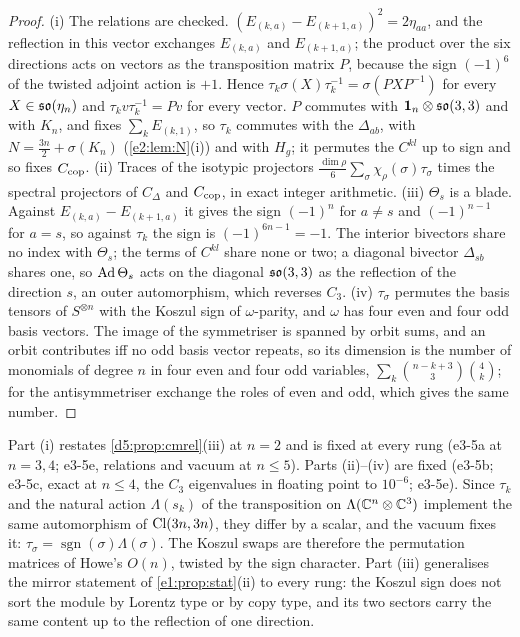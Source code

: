 \begin{proof}
(i) The relations are checked. $(E_{(k,a)}-E_{(k+1,a)})^2=2\eta_{aa}$, and the reflection in this vector exchanges $E_{(k,a)}$ and $E_{(k+1,a)}$; the product
over the six directions acts on vectors as the transposition matrix $P$, because the sign $(-1)^6$ of the twisted adjoint action is $+1$. Hence
$\tau_k\sigma(X)\tau_k^{-1}=\sigma(PXP^{-1})$ for every $X\in\mathfrak{so}(\eta_n)$ and $\tau_kv\tau_k^{-1}=Pv$ for every vector. $P$ commutes with $\mathbf 1_n\otimes\mathfrak{so}(3,3)$ and with
$K_n$, and fixes $\sum_kE_{(k,1)}$, so $\tau_k$ commutes with the $\Delta_{ab}$, with $N=\tfrac{3n}2+\sigma(K_n)$ (\cref{e2:lem:N}(i)) and with $H_g$; it permutes
the $C^{kl}$ up to sign and so fixes $C_{\rm cop}$. (ii) Traces of the isotypic projectors
$\frac{\dim\rho}{6}\sum_\sigma\chi_\rho(\sigma)\tau_\sigma$ times the spectral projectors of $C_\Delta$ and $C_{\rm cop}$, in exact integer arithmetic. (iii) $\Theta_s$ is a
blade. Against $E_{(k,a)}-E_{(k+1,a)}$ it gives the sign $(-1)^n$ for $a\ne s$ and $(-1)^{n-1}$ for $a=s$, so against $\tau_k$ the sign is $(-1)^{6n-1}=-1$.
The interior bivectors share no index with $\Theta_s$; the terms of $C^{kl}$ share none or two; a diagonal bivector $\Delta_{sb}$ shares one, so
$\operatorname{Ad}\Theta_s$ acts on the diagonal $\mathfrak{so}(3,3)$ as the reflection of the direction $s$, an outer automorphism, which reverses $C_3$. (iv) $\tau_\sigma$
permutes the basis tensors of $S^{\otimes n}$ with the Koszul sign of $\omega$-parity, and $\omega$ has four even and four odd basis vectors. The image of
the symmetriser is spanned by orbit sums, and an orbit contributes iff no odd basis vector repeats, so its dimension is the number of
monomials of degree $n$ in four even and four odd variables, $\sum_k\binom{n-k+3}3\binom4k$; for the antisymmetriser exchange the roles of even
and odd, which gives the same number.
\end{proof}

Part (i) restates \cref{d5:prop:cmrel}(iii) at $n=2$ and is fixed at every rung (e3-5a at $n=3,4$; e3-5e, relations and vacuum at
$n\le5$). Parts (ii)--(iv) are fixed (e3-5b; e3-5c, exact at $n\le4$, the $C_3$ eigenvalues in floating point to $10^{-6}$; e3-5e). Since $\tau_k$
and the natural action $\Lambda(s_k)$ of the transposition on $\Lambda(\mathbb{C}^n\otimes\mathbb{C}^3)$ implement the same automorphism of $\mathrm{Cl}(3n,3n)$, they differ by
a scalar, and the vacuum fixes it: $\tau_\sigma=\operatorname{sgn}(\sigma)\Lambda(\sigma)$. The Koszul swaps are therefore the permutation matrices of
Howe's $O(n)$, twisted by the sign character. Part (iii) generalises the mirror statement of \cref{e1:prop:stat}(ii) to every rung: the
Koszul sign does not sort the module by Lorentz type or by copy type, and its two sectors carry the same content up to the reflection of
one direction.

